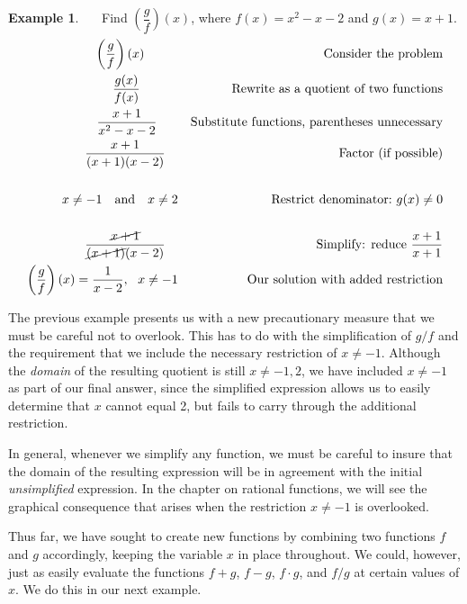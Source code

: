 \documentclass[12pt]{book}
\theoremstyle{definition}
\newtheorem{example}{Example}
\begin{document}
\begin{example}~~~Find $\left(\dfrac{g}{f}\right)(x)$, where $f(x) = x^2 - x - 2$ and $g(x) = x + 1$.
 \begin{eqnarray*}
    \left(\dfrac{g}{f}\right)(x)~~~~~~~~ &  & \text{Consider the problem} \\
		\dfrac{g(x)}{f(x)}~~~~~~~~~ &  & \text{Rewrite~as~a~quotient~of~two~functions}\\
    \dfrac{x + 1}{x^2 - x - 2}~~~~~  &  & \text{Substitute~functions,~parentheses~unnecessary}\\
  	 \dfrac{x+1}{(x+1)(x-2)}~~~&  & \text{Factor (if possible)}\\
  & & \\ 
		x \neq -1 ~~\text{~and~}~~ x \neq 2 &  & \text{Restrict~denominator:~}g(x)\neq 0\\
  & & \\ 
	\dfrac{\cancel{x + 1}}{\cancel{(x+1)}(x-2)}~~~  & & \text{Simplify: reduce $\dfrac{x+1}{x+1}$}\\
	\left(\dfrac{g}{f}\right)(x)=\dfrac{1}{x-2}, ~~ x \neq -1  & & \text{Our solution with added restriction}
	\end{eqnarray*}
\end{example}
The previous example presents us with a new precautionary measure that we must be careful not to overlook.  This has to do with the simplification of $g/f$ and the requirement that we include the necessary restriction of $x\neq -1$.  Although the {\it domain} of the resulting quotient is still $x\neq -1,2$, we have included $x\neq -1$ as part of our final answer, since the simplified expression allows us to easily determine that $x$ cannot equal 2, but fails to carry through the additional restriction.\par
In general, whenever we simplify any function, we must be careful to insure that the domain of the resulting expression will be in agreement with the initial {\it unsimplified} expression.  In the chapter on rational functions, we will see the graphical consequence that arises when the restriction $x\neq -1$ is overlooked.\par
Thus far, we have sought to create new functions by combining two functions $f$ and $g$ accordingly, keeping the variable $x$ in place throughout.  We could, however, just as easily evaluate the functions $f+g$, $f-g$, $f\cdot g$, and $f/g$ at certain values of $x$.  We do this in our next example.
\end{document}
